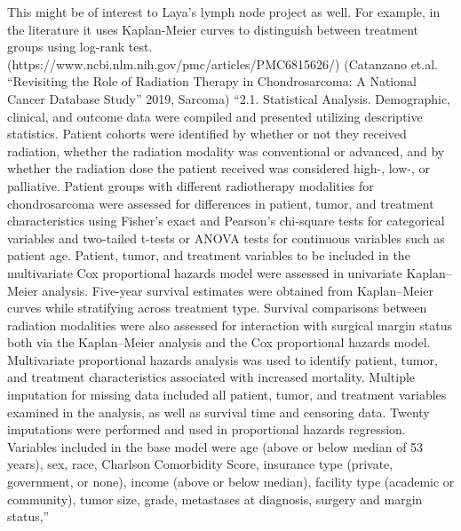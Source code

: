 \documentclass{article}%
\begin{document}
\newline%
\newline%
%
This might be of interest to Laya’s lymph node project as well. %
\newline%
\newline%
%
For example, in the literature it uses Kaplan{-}Meier curves to distinguish between treatment groups using log{-}rank test. (https://www.ncbi.nlm.nih.gov/pmc/articles/PMC6815626/) %
\newline%
\newline%
%
 (Catanzano et.al. “Revisiting the Role of Radiation Therapy in Chondrosarcoma: A National Cancer Database Study” 2019, Sarcoma)%
\newline%
\newline%
%
“2.1. Statistical Analysis. Demographic, clinical, and outcome data were compiled and presented utilizing descriptive statistics. Patient cohorts were identified by whether or not they received radiation, whether the radiation modality was conventional or advanced, and by whether the radiation dose the patient received was considered high{-}, low{-}, or palliative. Patient groups with different radiotherapy modalities for chondrosarcoma were assessed for differences in patient, tumor, and treatment characteristics using Fisher’s exact and Pearson’s chi{-}square tests for categorical variables and two{-}tailed t{-}tests or ANOVA tests for continuous variables such as patient age. Patient, tumor, and treatment variables to be included in the multivariate Cox proportional hazards model were assessed in univariate Kaplan–Meier analysis. Five{-}year survival estimates were obtained from Kaplan–Meier curves while stratifying across treatment type. Survival comparisons between radiation modalities were also assessed for interaction with surgical margin status both via the Kaplan–Meier analysis and the Cox proportional hazards model. Multivariate proportional hazards analysis was used to identify patient, tumor, and treatment characteristics associated with increased mortality. Multiple imputation for missing data included all patient, tumor, and treatment variables examined in the analysis, as well as survival time and censoring data. Twenty imputations were performed and used in proportional hazards regression. Variables included in the base model were age (above or below median of 53 years), sex, race, Charlson Comorbidity Score, insurance type (private, government, or none), income (above or below median), facility type (academic or community), tumor size, grade, metastases at diagnosis, surgery and margin status,”%
\end{document}

